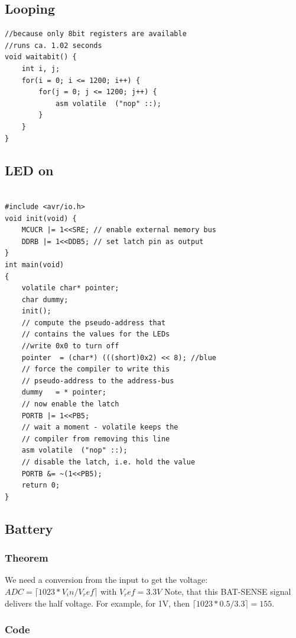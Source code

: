 \subsection{Looping}
\begin{lstlisting}[basicstyle=\tiny]
//because only 8bit registers are available
//runs ca. 1.02 seconds
void waitabit() {
	int i, j;
	for(i = 0; i <= 1200; i++) {
		for(j = 0; j <= 1200; j++) {
			asm volatile  ("nop" ::);
		}
	}
}
\end{lstlisting}


\subsection{LED on}

\begin{lstlisting}[basicstyle=\tiny] %, %or \tiny ,\small or \footnotesize etc.

#include <avr/io.h>
void init(void) {
	MCUCR |= 1<<SRE; // enable external memory bus
	DDRB |= 1<<DDB5; // set latch pin as output
}
int main(void)
{
	volatile char* pointer;
	char dummy;
	init();
	// compute the pseudo-address that
	// contains the values for the LEDs
	//write 0x0 to turn off
	pointer  = (char*) (((short)0x2) << 8); //blue
	// force the compiler to write this
	// pseudo-address to the address-bus
	dummy   = * pointer;
	// now enable the latch
	PORTB |= 1<<PB5;
	// wait a moment - volatile keeps the
	// compiler from removing this line
	asm volatile  ("nop" ::);
	// disable the latch, i.e. hold the value
	PORTB &= ~(1<<PB5);
	return 0;
}

\end{lstlisting}

\subsection{Battery}


\subsubsection{Theorem}
We need a conversion from the input to get the voltage: $ ADC = \lceil 1023*V_in / V_ref \rceil$ with $V_ref = 3.3V$ Note, that this BAT-SENSE signal delivers the half voltage. For example, for 1V, then $\lceil 1023*0.5 / 3.3 \rceil = 155 $.

\subsubsection{Code}

